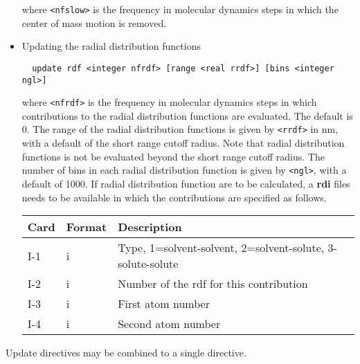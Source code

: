 \begin{itemize}
where \verb+<nfslow>+ is the frequency in molecular dynamics steps in
which the center of mass motion is removed.
\item
Updating the radial distribution functions
\begin{verbatim}
  update rdf <integer nfrdf> [range <real rrdf>] [bins <integer ngl>]
\end{verbatim}
where \verb+<nfrdf>+ is the frequency in molecular dynamics steps in 
which contributions to the radial distribution functions are
evaluated. The default is 0. The range of the radial distribution
functions is given by \verb+<rrdf>+ in nm, with a default of the short
range cutoff radius. Note that radial distribution functions is not
be evaluated beyond the short range cutoff radius. The number of
bins in each radial distribution function is given by \verb+<ngl>+, with
a default of 1000.
If radial distribution function are to be
calculated, a {\bf rdi} files needs to be available in which the
contributions are specified as follows.
\begin{center}
\begin{tabular}{lll}
\hline\hline
Card & Format & Description \\ \hline
I-1  & i & Type, 1=solvent-solvent, 2=solvent-solute,
3-solute-solute\\
I-2  & i & Number of the rdf for this contribution\\
I-3  & i & First atom number \\
I-4  & i & Second atom number \\ 
\hline
\end{tabular}
\end{center}
\end{itemize}
Update directives may be combined to a single directive.


